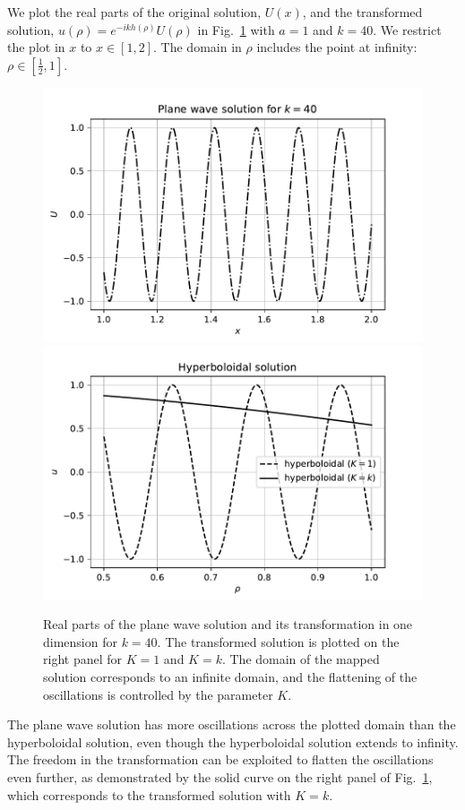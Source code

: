 \documentclass[final,onefignum,onetabnum]{siamart190516}
\begin{document}
We plot the real parts of the original solution, $U(x)$, and the transformed solution, $u(\rho)=e^{-ikh(\rho)}U(\rho)$ in Fig.~\ref{fig:oned} with $a=1$ and $k=40$. We restrict the plot in $x$ to $x\in[1,2]$. The domain in $\rho$ includes the point at infinity: $\rho\in[\tfrac{1}{2},1]$.
\begin{figure}[tbhp]
	\centering
	\includegraphics[scale=0.4]{figs/st_oned}
	\includegraphics[scale=0.4]{figs/hyp_oned.pdf}
	\caption{Real parts of the plane wave solution and its transformation in one dimension for $k=40$. The transformed solution is plotted on the right panel for $K=1$ and $K=k$. The domain of the mapped solution corresponds to an infinite domain, and the flattening of the oscillations is controlled by the parameter $K$.}
	\label{fig:oned}
\end{figure}

The plane wave solution has more oscillations across the plotted domain than the hyperboloidal solution, even though the hyperboloidal solution extends to infinity. The freedom in the transformation can be exploited to flatten the oscillations even further, as demonstrated by the solid curve on the right panel of Fig.~\ref{fig:oned}, which corresponds to the transformed solution with $K=k$.
\end{document}
